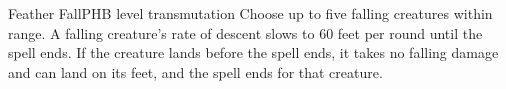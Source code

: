 \begin{spell}{Feather Fall}{PHB}{ level transmutation}
{
}
Choose up to five falling creatures within range. A
falling creature's rate of descent slows to 60 feet per
round until the spell ends. If the creature lands before
the spell ends, it takes no falling damage and can land
on its feet, and the spell ends for that creature.
\end{spell}